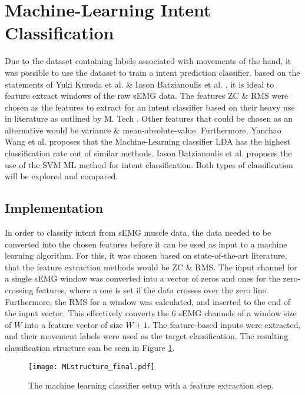 \documentclass[../main.tex]{subfiles}
\begin{document}
\section{Machine-Learning Intent Classification}
\label{sec:machine-learning}

Due to the dataset containing labels associated with movements of the hand, it was possible to use the dataset to train a intent prediction classifier.
based on the statements of Yuki Kuroda et al. \cite{Yuki2023} \& Iason Batzianoulis et al.  \cite{Batzianoulis2018}, it is ideal to feature extract windows of the raw sEMG data.
The features \gls{ZC} \& \gls{RMS} were chosen as the features to extract for an intent classifier based on their heavy use in literature as outlined by M. Tech \cite{Tech2015}.
Other features that could be chosen as an alternative would be variance \& mean-absolute-value.
Furthermore, Yanchao Wang et al. \cite{YanchaoWang2022} proposes that the Machine-Learning classifier LDA has the highest classification rate out of similar methods.
Iason Batzianoulis et al. \cite{Batzianoulis2018} proposes the use of the \gls{SVM} \gls{ML} method for intent classification.
Both types of classification will be explored and compared.

\subsection{Implementation}

In order to classify intent from sEMG muscle data, the data needed to be converted into the chosen features before it can be used as input to a machine learning algorithm.
For this, it was chosen based on state-of-the-art literature, that the feature extraction methods would be \gls{ZC} \& \gls{RMS}.
The input channel for a single sEMG window was converted into a vector of zeros and ones for the zero-crossing features, where a one is set if the data crosses over the zero line.
Furthermore, the RMS for a window was calculated, and inserted to the end of the input vector. This effectively converts the 6 sEMG channels of a window size of $W$ into a feature vector of size $W+1$.
The feature-based inputs were extracted, and their movement labels were used as the target classification.
The resulting classification structure can be seen in Figure \ref{fig:mlclassifier}.

\begin{figure}[H]
\begin{center}
\texttt{[image: MLstructure\_final.pdf]}
\caption{The machine learning classifier setup with a feature extraction step.}
\label{fig:mlclassifier}
\end{center}
\end{figure}
\end{document}
